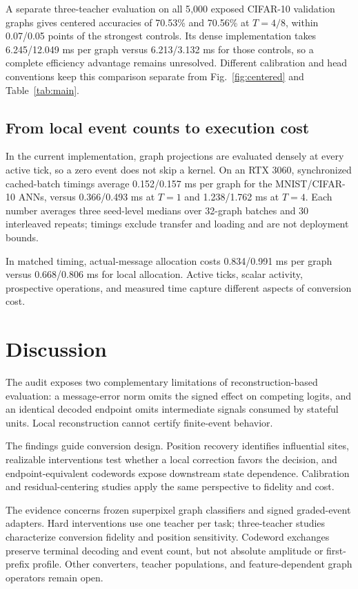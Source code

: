 \documentclass[10pt,twocolumn,letterpaper]{article}
\begin{document}
A separate three-teacher evaluation on all 5{,}000 exposed CIFAR-10 validation graphs gives centered accuracies of 70.53\% and 70.56\% at $T{=}4/8$, within 0.07/0.05 points of the strongest controls. Its dense implementation takes 6.245/12.049 ms per graph versus 6.213/3.132 ms for those controls, so a complete efficiency advantage remains unresolved. Different calibration and head conventions keep this comparison separate from Fig.~\ref{fig:centered} and Table~\ref{tab:main}.

\subsection{From local event counts to execution cost}
In the current implementation, graph projections are evaluated densely at every active tick, so a zero event does not skip a kernel. On an RTX 3060, synchronized cached-batch timings average 0.152/0.157 ms per graph for the MNIST/CIFAR-10 ANNs, versus 0.366/0.493 ms at $T{=}1$ and 1.238/1.762 ms at $T{=}4$. Each number averages three seed-level medians over 32-graph batches and 30 interleaved repeats; timings exclude transfer and loading and are not deployment bounds.

In matched timing, actual-message allocation costs 0.834/0.991 ms per graph versus 0.668/0.806 ms for local allocation. Active ticks, scalar activity, prospective operations, and measured time capture different aspects of conversion cost.

\section{Discussion}
The audit exposes two complementary limitations of reconstruction-based evaluation: a message-error norm omits the signed effect on competing logits, and an identical decoded endpoint omits intermediate signals consumed by stateful units. Local reconstruction cannot certify finite-event behavior.

The findings guide conversion design. Position recovery identifies influential sites, realizable interventions test whether a local correction favors the decision, and endpoint-equivalent codewords expose downstream state dependence. Calibration and residual-centering studies apply the same perspective to fidelity and cost.

The evidence concerns frozen superpixel graph classifiers and signed graded-event adapters. Hard interventions use one teacher per task; three-teacher studies characterize conversion fidelity and position sensitivity. Codeword exchanges preserve terminal decoding and event count, but not absolute amplitude or first-prefix profile. Other converters, teacher populations, and feature-dependent graph operators remain open.
\end{document}
